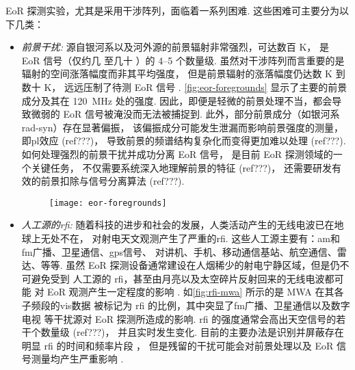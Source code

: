 EoR 探测实验，尤其是采用干涉阵列，面临着一系列困难.
这些困难可主要分为以下几类：
\begin{itemize}
\item
\emph{前景干扰:}
源自银河系以及河外源的前景辐射非常强烈，可达数百 \si{\kelvin}，
是 EoR 信号（仅约几 \si{\mK} 至几十 \si{\mK}）的 \numrange{4}{5} 个数量级.
虽然对干涉阵列而言重要的是辐射的空间涨落幅度而非其平均强度，
但是前景辐射的涨落幅度仍达数 \si{\kelvin} 到数十 \si{\kelvin}，
远远压制了待测 EoR 信号 \cite{zaroubi2013}.
\autoref{fig:eor-foregrounds} 显示了主要的前景成分及其在
\SI{120}{\MHz} 处的强度.
因此，即便是轻微的前景处理不当，都会导致微弱的 EoR 信号被淹没而无法被捕捉到.
此外，部分前景成分（如银河系\ac{rad-syn}）存在显著偏振，
该偏振成分可能发生泄漏而影响前景强度的测量，即\ac{pl}效应 (ref???)，
导致前景的频谱结构复杂化而变得更加难以处理 (ref???).
如何处理强烈的前景干扰并成功分离 EoR 信号，
是目前 EoR 探测领域的一个关键任务，
不仅需要系统深入地理解前景的特征 \cite{offringa2016,carroll2016,procopio2017} (ref???)，
还需要研发有效的前景扣除与信号分离算法 \cite{chapman2015,chapman2016} (ref???).

\begin{figure}[tbp]
  \centering
  \texttt{[image: eor-foregrounds]}
  \label{fig:eor-foregrounds}
\end{figure}

\item
\emph{人工源的\acl{rfi}:}
随着科技的进步和社会的发展，人类活动产生的无线电波已在地球上无处不在，
对射电天文观测产生了严重的\acf{rfi}.
这些人工源主要有：\ac{am}和\ac{fm}广播、卫星通信、\ac{gps}信号、
对讲机、手机、移动通信基站、航空通信、雷达、等等.
虽然 EoR 探测设备通常建设在人烟稀少的射电宁静区域，但是仍不可避免受到
人工源的 \ac{rfi}，甚至由月亮以及太空碎片反射回来的无线电波都可能
对 EoR 观测产生一定程度的影响 \cite{mckinley2013,tingay2013rfi}.
如\autoref{fig:rfi-mwa} 所示的是 MWA 在其各子频段的\ac{vis}数据
被标记为 \ac{rfi} 的比例，其中突显了\ac{fm}广播、卫星通信以及数字电视
等干扰源对 EoR 探测所造成的影响.
\ac{rfi} 的强度通常会高出天空信号的若干个数量级 \cite{bentum2011} (ref???)，
并且实时发生变化.
目前的主要办法是识别并屏蔽存在明显 \ac{rfi} 的时间和频率片段
\cite{offringa2010,offringa2012,prasad2012}，
但是残留的干扰可能会对前景处理以及 EoR 信号测量均产生严重影响 \cite{offringa2015}.


\end{itemize}
